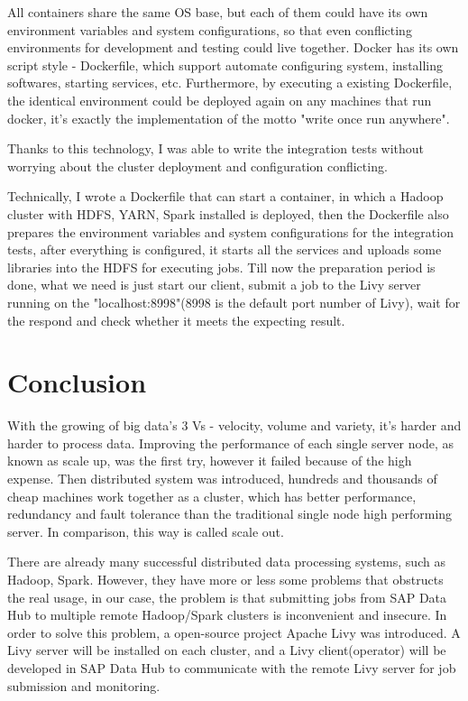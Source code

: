 \documentclass[article,colorback,accentcolor=tud4c]{tudreport}
\begin{document}
	All containers share the same OS base, but each of them could have its own environment variables and system configurations, so that even conflicting environments for development and testing could live together. Docker has its own script style - Dockerfile, which support automate configuring system, installing softwares, starting services, etc. Furthermore, by executing a existing Dockerfile, the identical environment could be deployed again on any machines that run docker, it's exactly the implementation of the motto "write once run anywhere".
	
	Thanks to this technology, I was able to write the integration tests without worrying about the cluster deployment and configuration conflicting.
	
	Technically, I wrote a Dockerfile that can start a container, in which a Hadoop cluster with HDFS, YARN, Spark installed is deployed, then the Dockerfile also prepares the environment variables and system configurations for the integration tests, after everything is configured, it starts all the services and uploads some libraries into the HDFS for executing jobs. Till now the preparation period is done, what we need is just start our client, submit a job to the Livy server running on the "localhost:8998"(8998 is the default port number of Livy), wait for the respond and check whether it meets the expecting result.

\newpage

\section{Conclusion}
\setcounter{table}{0}
\setcounter{figure}{0}

With the growing of big data's 3 Vs - velocity, volume and variety, it's harder and harder to process data. Improving the performance of each single server node, as known as scale up, was the first try, however it failed because of the high expense. Then distributed system was introduced, hundreds and thousands of cheap machines work together as a cluster, which has better performance, redundancy and fault tolerance than the traditional single node high performing server. In comparison, this way is called scale out. 

There are already many successful distributed data processing systems, such as Hadoop, Spark. However, they have more or less some problems that obstructs the real usage, in our case, the problem is that submitting jobs from SAP Data Hub to multiple remote Hadoop/Spark clusters is inconvenient and insecure. In order to solve this problem, a open-source project Apache Livy was introduced. A Livy server will be installed on each cluster, and a Livy client(operator) will be developed in SAP Data Hub to communicate with the remote Livy server for job submission and monitoring.
\end{document}
